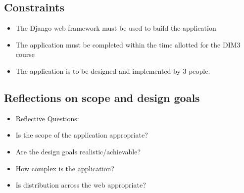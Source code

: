 \documentclass{sig-alt-release2}
\begin{document}
\subsection{Constraints}
\label{sec: constraints} 
\begin{itemize} 
\item The Django web framework must be used to build the application
\item The application must be completed within the time allotted for the DIM3 course
\item The application is to be designed and implemented by 3 people.
\end{itemize}

\subsection{Reflections on scope and design goals}
\begin{itemize}
\item	Reflective Questions: 
\item	Is the scope of the application appropriate? 
\item	Are the design goals realistic/achievable? 
\item	How complex is the application? %
\item	Is distribution across the web appropriate? %
\end{itemize}
\end{document}
